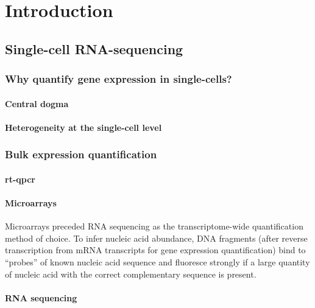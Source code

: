 \chapter{Introduction}\label{ch:introduction}

\section{Single-cell RNA-sequencing}

\subsection{Why quantify gene expression in single-cells?}

\subsubsection{Central dogma}

\subsubsection{Heterogeneity at the single-cell level}


\subsection{Bulk expression quantification}

\subsubsection{rt-qpcr}


\subsubsection{Microarrays}


Microarrays preceded RNA sequencing as the transcriptome-wide quantification method of choice. To infer nucleic acid abundance, DNA fragments (after reverse transcription from mRNA transcripts for gene expression quantification) bind to ``probes'' of known nucleic acid sequence and fluoresce strongly if a large quantity of nucleic acid with the correct complementary sequence is present.

\subsubsection{RNA sequencing}



